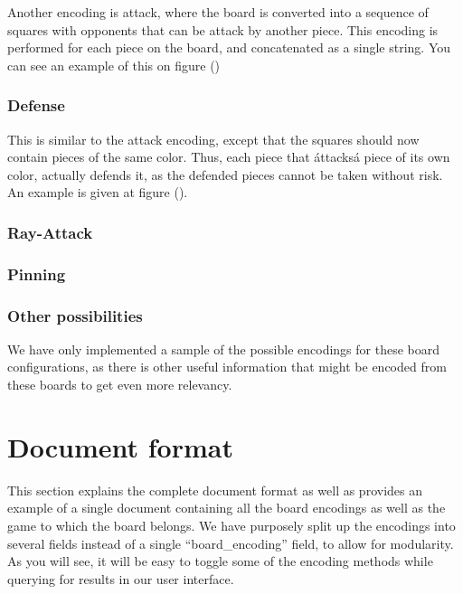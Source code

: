 \documentclass[11pt]{article}
\begin{document}
    Another encoding is attack, where the board is converted into a sequence of squares with opponents that can be attack by another piece. This encoding is performed for each piece on the board, and concatenated as a single string. You can see an example of this on figure ()

    \subsubsection{Defense}

    This is similar to the attack encoding, except that the squares should now contain pieces of the same color. Thus, each piece that \'attacks\' a piece of its own color, actually defends it, as the defended pieces cannot be taken without risk. An example is given at figure ().

    \subsubsection{Ray-Attack}

    \subsubsection{Pinning}

    \subsubsection{Other possibilities}

    We have only implemented a sample of the possible encodings for these board configurations, as there is other useful information that might be encoded from these boards to get even more relevancy.



    \section{Document format}\label{sec:documentformat}


    This section explains the complete document format as well as provides an example of a single document containing all the board encodings as well as the game to which the board belongs. We have purposely split up the encodings into several fields instead of a single ``board\_encoding'' field, to allow for modularity. As you will see, it will be easy to toggle some of the encoding methods while querying for results in our user interface.
\end{document}

